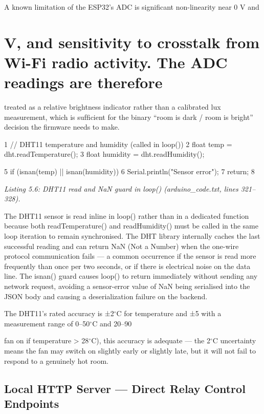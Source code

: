 A known limitation of the ESP32's ADC is signiﬁcant non-linearity near 0 V and
\section{V, and sensitivity to crosstalk from Wi-Fi radio activity. The ADC readings are therefore}

treated as a relative brightness indicator rather than a calibrated lux measurement, which
is sufﬁcient for the binary ``room is dark / room is bright'' decision the ﬁrmware needs to
make.

1 // DHT11 temperature and humidity (called in loop())
2 float temp = dht.readTemperature();
3 float humidity = dht.readHumidity();

5 if (isnan(temp) || isnan(humidity)) {
6 Serial.println("Sensor error");
7 return;
8 }



\textit{Listing 5.6: DHT11 read and NaN guard in loop() (arduino\_code.txt, lines 321--328).}



The DHT11 sensor is read inline in loop() rather than in a dedicated function because
both readTemperature() and readHumidity() must be called in the same loop iteration
to remain synchronised. The DHT library internally caches the last successful reading and
can return NaN (Not a Number) when the one-wire protocol communication fails --- a
common occurrence if the sensor is read more frequently than once per two seconds, or
if there is electrical noise on the data line. The isnan() guard causes loop() to return
immediately without sending any network request, avoiding a sensor-error value of NaN
being serialised into the JSON body and causing a deserialization failure on the backend.

The DHT11's rated accuracy is ±2$^\circ$C for temperature and ±5%
with a measurement range of 0--50$^\circ$C and 20--90%



fan on if temperature > 28$^\circ$C), this accuracy is adequate --- the 2$^\circ$C uncertainty means the
fan may switch on slightly early or slightly late, but it will not fail to respond to a genuinely
hot room.



\subsection{Local HTTP Server --- Direct Relay Control Endpoints}


